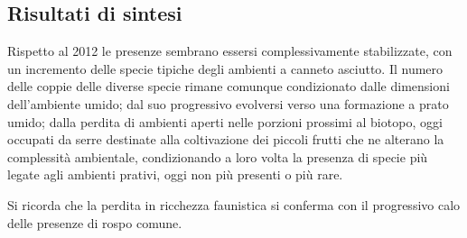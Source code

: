 \documentclass[11pt,a4paper,twoside]{memoir}
\begin{document}
\subsection{Risultati di sintesi}
Rispetto al 2012 le presenze sembrano essersi complessivamente stabilizzate, con un incremento delle specie tipiche degli ambienti a canneto asciutto. Il numero delle coppie delle diverse specie rimane comunque condizionato dalle dimensioni dell’ambiente umido; dal suo progressivo evolversi verso una formazione a prato umido; dalla perdita di ambienti aperti nelle porzioni prossimi al biotopo, oggi occupati da serre destinate alla coltivazione dei piccoli frutti che ne alterano la complessità ambientale, condizionando a loro volta la presenza di specie più legate agli ambienti prativi, oggi non più presenti o più rare.

Si ricorda che la perdita in ricchezza faunistica si conferma con il progressivo calo delle presenze di rospo comune.
\end{document}
